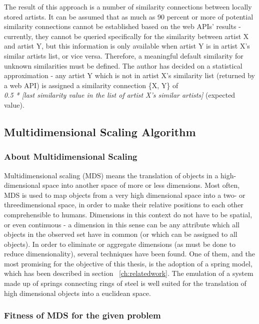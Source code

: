 The result of this approach is a number of similarity connections between locally stored artists. It can be assumed
that as much as 90 percent or more of potential similarity connections cannot be established based on the web APIs'
results - currently, they cannot be queried specifically for the similarity between artist X and artist Y, but 
this information is only available when artist Y is in artist X's similar artists list, or vice versa.
Therefore, a meaningful default similarity for unknown similarities must be defined. The author has decided on a
statistical approximation - any artist Y which is not in artist X's similarity list (returned by a web API) is 
assigned a similarity connection \{X, Y\} of \\
\emph{0.5 * [last similarity value in the list of artist X's similar artists]} (expected value).

\subsection{Multidimensional Scaling Algorithm}

\subsubsection{About Multidimensional Scaling}

Multidimensional scaling (MDS) means the translation of objects in a high-dimensional space into another space of more or less dimensions. Most often, MDS is used to map objects from a very high dimensional space into a two- or threedimensional space, in order to make their relative positions to each other comprehensible to humans. 
Dimensions in this context do not have to be spatial, or even continuous - a dimension in this sense can be any attribute which all objects in the observed set have in common (or which can be assigned to all objects).
In order to eliminate or aggregate dimensions (as must be done to reduce dimensionality), several techniques have been found.
One of them, and the most promising for the objective of this thesis, is the adoption of a spring model, which has been described in section ~\ref{ch:relatedwork}. The emulation of a system made up of springs connecting rings of steel is well suited for the translation of high dimensional objects into a euclidean space.

\subsubsection{Fitness of MDS for the given problem}

